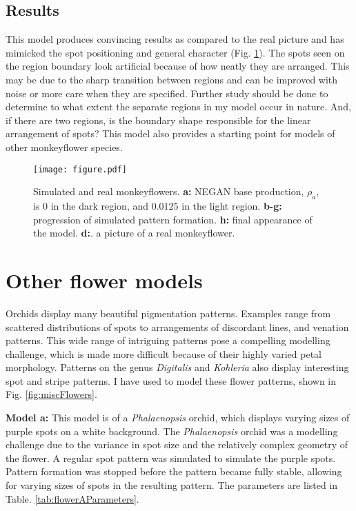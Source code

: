 \subsection*{Results}
This model produces convincing results as compared to the real picture and has mimicked the spot positioning and general character (Fig. \ref{fig:monkeyflower}). The spots seen on the region boundary look artificial because of how neatly they are arranged. This may be due to the sharp transition between regions and can be improved with noise or more care when they are specified. Further study should be done to determine to what extent the separate regions in my model occur in nature. And, if there are two regions, is the boundary shape responsible for the linear arrangement of spots? This model also provides a starting point for models of other monkeyflower species.

\begin{figure}[ht]
	\centering
	\texttt{[image: figure.pdf]}
	\caption[Simulated and real monkeyflowers]{Simulated and real monkeyflowers. \textbf{a:} NEGAN base production, $\rho_a$, is 0 in the dark region, and $0.0125$ in the light region. \textbf{b-g:} progression of simulated pattern formation. \textbf{h:} final appearance of the model. \textbf{d:}. a picture of a real monkeyflower.}
	\label{fig:monkeyflower}
\end{figure}

\section{Other flower models}
Orchids display many beautiful pigmentation patterns. Examples range from scattered distributions of spots to arrangements of discordant lines, and venation patterns. This wide range of intriguing patterns pose a compelling modelling challenge, which is made more difficult because of their highly varied petal morphology. Patterns on the genus \textit{Digitalis} and \textit{Kohleria} also display interesting spot and stripe patterns. I have used \ProgramName{} to model these flower patterns, shown in Fig. \ref{fig:miscFlowers}.

\textbf{Model a:} 
This model is of a \textit{Phalaenopsis} orchid, which displays varying sizes of purple spots on a white background. The \textit{Phalaenopsis} orchid was a modelling challenge due to the variance in spot size and the relatively complex geometry of the flower. A regular spot pattern was simulated to simulate the purple spots. Pattern formation was stopped before the pattern became fully stable, allowing for varying sizes of spots in the resulting pattern. The parameters are listed in Table. \ref{tab:flowerAParameters}.

